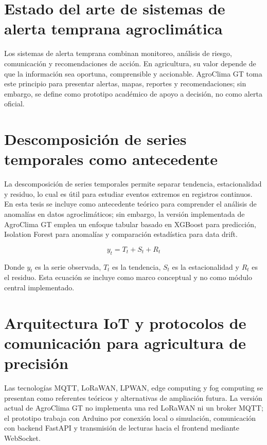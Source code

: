 \documentclass[12pt,letterpaper,oneside]{report}
\begin{document}
\section{Estado del arte de sistemas de alerta temprana agroclimática}
Los sistemas de alerta temprana combinan monitoreo, análisis de riesgo, comunicación y recomendaciones de acción. En agricultura, su valor depende de que la información sea oportuna, comprensible y accionable. AgroClima GT toma este principio para presentar alertas, mapas, reportes y recomendaciones; sin embargo, se define como prototipo académico de apoyo a decisión, no como alerta oficial.

\section{Descomposición de series temporales como antecedente}
La descomposición de series temporales permite separar tendencia, estacionalidad y residuo, lo cual es útil para estudiar eventos extremos en registros continuos. En esta tesis se incluye como antecedente teórico para comprender el análisis de anomalías en datos agroclimáticos; sin embargo, la versión implementada de AgroClima GT emplea un enfoque tabular basado en XGBoost para predicción, Isolation Forest para anomalías y comparación estadística para data drift.

\begin{equation}
y_t = T_t + S_t + R_t
\end{equation}

Donde $y_t$ es la serie observada, $T_t$ es la tendencia, $S_t$ es la estacionalidad y $R_t$ es el residuo. Esta ecuación se incluye como marco conceptual y no como módulo central implementado.

\section{Arquitectura IoT y protocolos de comunicación para agricultura de precisión}
Las tecnologías MQTT, LoRaWAN, LPWAN, edge computing y fog computing se presentan como referentes teóricos y alternativas de ampliación futura. La versión actual de AgroClima GT no implementa una red LoRaWAN ni un broker MQTT; el prototipo trabaja con Arduino por conexión local o simulación, comunicación con backend FastAPI y transmisión de lecturas hacia el frontend mediante WebSocket.
\end{document}
